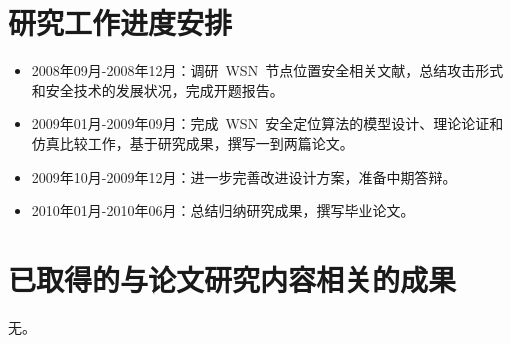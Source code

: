 \documentclass[a4paper,10pt]{article}
\begin{document}
\section{研究工作进度安排}

\begin{itemize}
\item 2008年09月-2008年12月：调研~WSN~节点位置安全相关文献，总结攻击形式和安全技术的发展状况，完成开题报告。
\item 2009年01月-2009年09月：完成~WSN~安全定位算法的模型设计、理论论证和仿真比较工作，基于研究成果，撰写一到两篇论文。
\item 2009年10月-2009年12月：进一步完善改进设计方案，准备中期答辩。
\item 2010年01月-2010年06月：总结归纳研究成果，撰写毕业论文。
\end{itemize}


\section{已取得的与论文研究内容相关的成果} 

无。



\end{document}
